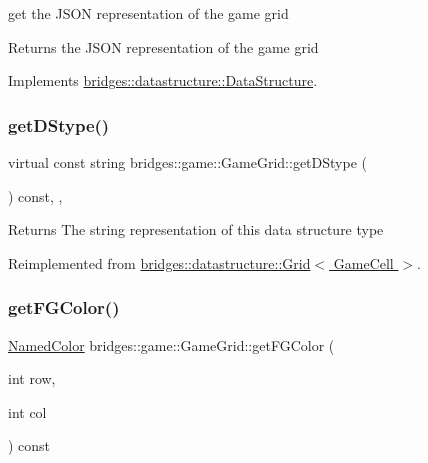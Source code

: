 get the J\+S\+ON representation of the game grid

\begin{DoxyReturn}{Returns}
the J\+S\+ON representation of the game grid 
\end{DoxyReturn}


Implements \hyperlink{classbridges_1_1datastructure_1_1_data_structure}{bridges\+::datastructure\+::\+Data\+Structure}.

\mbox{\label{classbridges_1_1game_1_1_game_grid_a07da19700a077e3d0f2cde2cade2ba60}} 
\subsubsection{\texorpdfstring{get\+D\+Stype()}{getDStype()}}
{\footnotesize\ttfamily virtual const string bridges\+::game\+::\+Game\+Grid\+::get\+D\+Stype (\begin{DoxyParamCaption}{ }\end{DoxyParamCaption}) const\hspace{0.3cm}{\ttfamily [inline]}, {\ttfamily [override]}, {\ttfamily [virtual]}}

\begin{DoxyReturn}{Returns}
The string representation of this data structure type 
\end{DoxyReturn}


Reimplemented from \hyperlink{classbridges_1_1datastructure_1_1_grid_a16aeae38446b96f440dea15f2b19334d}{bridges\+::datastructure\+::\+Grid$<$ Game\+Cell $>$}.

\mbox{\label{classbridges_1_1game_1_1_game_grid_a6d38c8ac0d4ccbdd1b2b1c5d2f445d9a}} 
\subsubsection{\texorpdfstring{get\+F\+G\+Color()}{getFGColor()}}
{\footnotesize\ttfamily \hyperlink{namespacebridges_1_1game_afaa832a4322b25b6a4ebfba832f10f26}{Named\+Color} bridges\+::game\+::\+Game\+Grid\+::get\+F\+G\+Color (\begin{DoxyParamCaption}\item[{int}]{row,  }\item[{int}]{col }\end{DoxyParamCaption}) const\hspace{0.3cm}{\ttfamily [inline]}}

